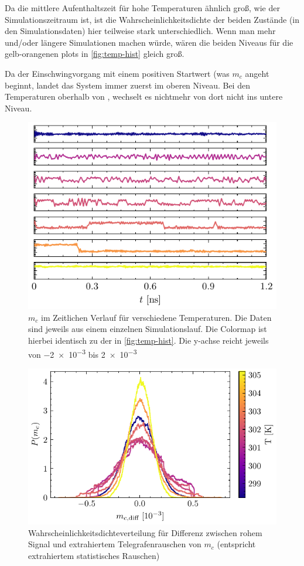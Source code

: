 \documentclass[main.tex]{subfiles}
\begin{document}
Da die mittlere Aufenthaltszeit  für hohe Temperaturen ähnlich groß, wie der Simulationszeitraum ist, ist die Wahrscheinlichkeitsdichte der beiden Zustände (in den Simulationsdaten) hier teilweise stark unterschiedlich. Wenn man mehr und/oder längere Simulationen machen würde, wären die beiden Niveaus für die gelb-orangenen plots in \cref{fig:temp-hist} gleich groß.

Da der Einschwingvorgang mit einem positiven Startwert (was \(m_c\) angeht beginnt, landet das System immer zuerst im oberen Niveau. Bei den Temperaturen oberhalb von , wechselt es nichtmehr von dort nicht ins untere Niveau. 

\begin{figure}[H]
    \centering
    \includegraphics{bilder/plots/temp_comparison_long/mc_time.pdf}
    \caption{\(m_c\) im Zeitlichen Verlauf für verschiedene Temperaturen. Die Daten sind jeweils aus einem einzelnen Simulationslauf. Die Colormap ist hierbei identisch zu der in \cref{fig:temp-hist}. Die y-achse reicht jeweils von \num{-2e-3} bis \num{+2e-3}}\label{fig:temp-time}
\end{figure}

\begin{figure}[H]
    \centering
    \includegraphics{bilder/plots/temp_comparison_long/mc_diff_hist.pdf}
    \caption{Wahrscheinlichkeitsdichteverteilung für Differenz zwischen rohem Signal und extrahiertem Telegrafenrauschen von \(m_c\) (entspricht extrahiertem statistisches Rauschen)}\label{fig:temp-diff-hist}    
\end{figure}
\end{document}
